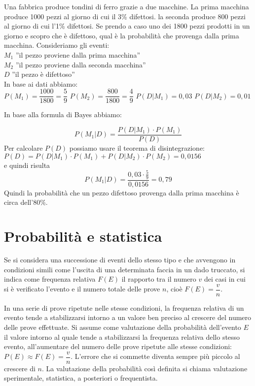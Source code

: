 \begin{exrig}
\begin{esempio}
Una fabbrica produce tondini di ferro grazie a due macchine. La prima macchina 
produce 1000 pezzi al giorno di cui il 3\% difettosi. la seconda produce 800 
pezzi al giorno di cui l'1\% difettosi. Se prendo a caso uno dei 1800 pezzi 
prodotti in un giorno e scopro che è difettoso, qual è la probabilità che 
provenga dalla prima macchina.
Consideriamo gli eventi:\\
$M_1$ ''il pezzo proviene dalla prima macchina''\\
$M_2$ ''il pezzo proviene dalla seconda macchina''\\
$D$ ''il pezzo è difettoso''\\
In base ai dati abbiamo:\\
$P(M_1)=\dfrac{1000}{1800}=\dfrac{5}{9}$
$P(M_2)=\dfrac{800}{1800}=\dfrac{4}{9}$
$P(D|M_1)=0,03$
$P(D|M_2)=0,01$
\end{esempio}

In base alla formula di Bayes abbiamo:

$$P(M_1|D)=\dfrac{P(D|M_1)\cdot P(M_1)}{P(D)}$$
Per calcolare $P(D)$ possiamo usare il teorema di disintegrazione:\\
$P(D)=P(D|M_1)\cdot P(M_1) + P(D|M_2)\cdot P(M_2)=0,0156$\\
e quindi risulta 
$$P(M_1|D)=\dfrac{0,03 \cdot \frac{5}{9}}{0,0156}=0,79$$
Quindi la probabilità che un pezzo difettoso provenga dalla prima macchina è 
circa dell'80\%.
\end{exrig}



\section{Probabilità e statistica}
\label{sec:06_statistica}
Se si considera una successione di eventi dello stesso tipo e che avvengono in 
condizioni simili come l'uscita di una determinata faccia in un dado truccato, 
si indica come frequenza relativa $F(E)$ il rapporto tra il numero $v$ dei casi 
in cui si è verificato l'evento e il numero totale delle prove $n$, cioè 
$F(E)=\dfrac v n$.

In una serie di prove ripetute nelle stesse condizioni, la frequenza relativa 
di 
un evento tende a stabilizzarsi intorno a un valore ben preciso al crescere del 
numero delle prove effettuate.
Si assume come valutazione della probabilità dell'evento $E$ il valore intorno 
al quale tende a stabilizzarsi la frequenza relativa dello stesso evento, 
all'aumentare del numero delle prove ripetute alle stesse condizioni: 
$P(E)\approx F(E)=\dfrac v n$.
L'errore che si commette diventa sempre più piccolo al crescere di $n$. La 
valutazione della probabilità così definita si chiama valutazione sperimentale, 
statistica, a posteriori o frequentista.

